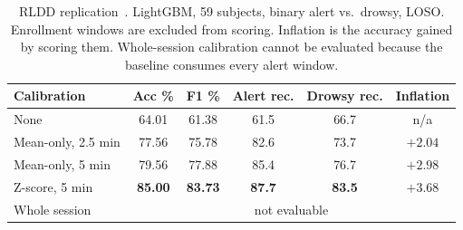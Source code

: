 \documentclass[journal]{IEEEtran}
\begin{document}
\begin{table}[!t]
\caption{RLDD replication~\cite{ghoddoosian2019uta}. LightGBM, 59 subjects,
binary alert vs.\ drowsy, LOSO. Enrollment windows are excluded from scoring.
Inflation is the accuracy gained by scoring them. Whole-session calibration
cannot be evaluated because the baseline consumes every alert window.}
\label{tab:rldd}
\centering\footnotesize
\setlength{\tabcolsep}{3.5pt}
\begin{tabular}{@{}lccccc@{}}
\toprule
Calibration & Acc \% & F1 \% & Alert rec. & Drowsy rec. & Inflation \\
\midrule
None                 & 64.01 & 61.38 & 61.5 & 66.7 & n/a \\
Mean-only, 2.5 min   & 77.56 & 75.78 & 82.6 & 73.7 & $+2.04$ \\
Mean-only, 5 min     & 79.56 & 77.88 & 85.4 & 76.7 & $+2.98$ \\
Z-score, 5 min       & \textbf{85.00} & \textbf{83.73} & \textbf{87.7} & \textbf{83.5} & $+3.68$ \\
Whole session        & \multicolumn{5}{c}{not evaluable} \\
\bottomrule
\end{tabular}
\end{table}
\end{document}
